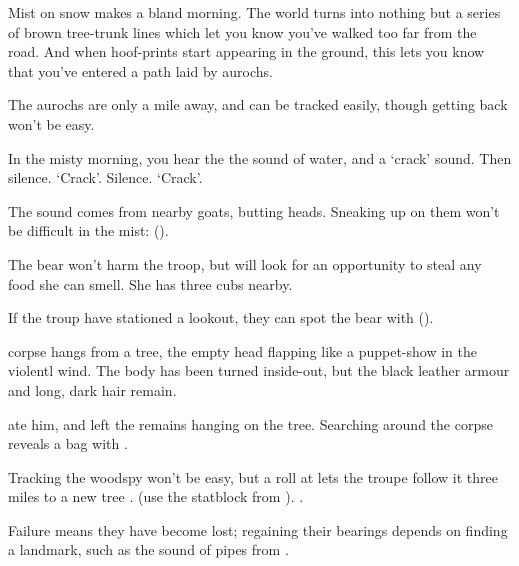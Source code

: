 
\ifcase\value{cycle}


\begin{boxtext}
  Mist on snow makes a bland morning.
  The world turns into nothing but a series of brown tree-trunk lines which let you know you've walked too far from the road.
  And when hoof-prints start appearing in the ground, this lets you know that you've entered a path laid by aurochs.
\end{boxtext}

The aurochs are only a mile away, and can be tracked easily, though getting back won't be easy.

\or


\begin{boxtext}
  In the misty morning, you hear the the sound of water, and a `crack' sound.
  Then silence.
  `Crack'.
  Silence.
  `Crack'.
\end{boxtext}

The sound comes from nearby goats, butting heads.
Sneaking up on them won't be difficult in the mist:  (\tn[9]).

\or


The bear won't harm the troop, but will look for an opportunity to steal any food she can smell.
She has three cubs nearby.

\setcounter{tn}{\value{Dexterity}}
\addtocounter{tn}{\value{Stealth}}

If the troup have stationed a lookout, they can spot the bear with  (\tn).

\bear

\else


\begin{boxtext}
   corpse hangs from a tree, the empty head flapping like a puppet-show in the violentl wind.
  The body has been turned inside-out, but the black leather armour and long, dark hair remain.
\end{boxtext}

 ate him, and left the remains hanging on the tree.
Searching around the corpse reveals a bag with \lootSmall.

Tracking the \gls{woodspy} won't  be easy, but a  roll at \tn[10] lets the troupe follow it three miles to a new tree%
%
  {%
      {.}%
      {(use the statblock from ).}%
  }{.
    \woodspy
  }

Failure means they have become lost; regaining their bearings depends on finding a landmark, such as the sound of pipes from .

\fi

